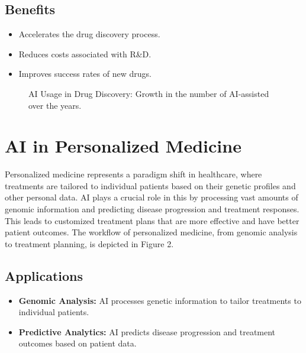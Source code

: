 \documentclass[12pt, a4paper]{article}
\begin{document}
\subsection{Benefits}
\begin{itemize}
    \item Accelerates the drug discovery process.
    \item Reduces costs associated with R\&D.
    \item Improves success rates of new drugs.
\end{itemize}

\begin{figure}[h]
    \centering
    \caption{AI Usage in Drug Discovery: Growth in the number of AI-assisted over the years.}
    \label{fig:ai_surgery_chart}
\end{figure}

\section{AI in Personalized Medicine}
Personalized medicine represents a paradigm shift in healthcare, where treatments are tailored to individual patients based on their genetic profiles and other personal data. AI plays a crucial role in this by processing vast amounts of genomic information and predicting disease progression and treatment responses. This leads to customized treatment plans that are more effective and have better patient outcomes. The workflow of personalized medicine, from genomic analysis to treatment planning, is depicted in Figure 2.
\subsection{Applications}
\begin{itemize}
    \item \textbf{Genomic Analysis:} AI processes genetic information to tailor treatments to individual patients.
    \item \textbf{Predictive Analytics:} AI predicts disease progression and treatment outcomes based on patient data.
\end{itemize}
\end{document}
